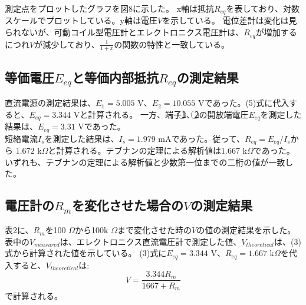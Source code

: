 \documentclass[a4paper,10pt]{jsarticle}
\begin{document}
測定点をプロットしたグラフを図8に示した。
x軸は抵抗$R_{eq}$を表しており、対数スケールでプロットしている。y軸は電圧$V$を示している。
電位差計は変化は見られないが、可動コイル型電圧計とエレクトロニクス電圧計は、$R_{eq}$が増加するにつれ$V$が減少しており、$\frac{1}{1 + x}$の関数の特性と一致している。


\subsection{等価電圧$E_{eq}$と等価内部抵抗$R_{eq}$の測定結果}
直流電源の測定結果は、$E_1 = 5.005$ V、$E_2 = 10.055$ Vであった。(5)式に代入すると、$E_{eq} = 3.344$ Vと計算される。
一方、端子\textcircled{1}、\textcircled{2}の開放端電圧$E_{eq}$を測定した結果は、$E_{eq} = 3.31$ Vであった。\\
短絡電流$I_s$を測定した結果は、$I_s = 1.979$ mAであった。従って、$R_{eq} = E_{eq}/I_s$から $1.672$ k$\Omega$と計算される。テブナンの定理による解析値は$1.667$ k$\Omega$であった。
\\いずれも、テブナンの定理による解析値と少数第一位までの二桁の値が一致した。
\subsection{電圧計の$R_m$を変化させた場合の$V$の測定結果}
表2に、$R_m$を100 $\Omega$から100k $\Omega$まで変化させた時の$V$の値の測定結果を示した。
表中の$V_{measured}$は、エレクトロニクス直流電圧計で測定した値、$V_{theoretical}$は、(3)式から計算された値を示している。
(3)式に$E_{eq} = 3.344$ V、$R_{eq} = 1.667$ k$\Omega$を代入すると、$V_{theoretical}$は:
\begin{equation}
  V = \frac{3.344R_m}{1667 + R_m}
\end{equation}
で計算される。
\clearpage 
\begin{table}[htbp]
  \centering
  \caption{Measured and theoretical values of V corresponding to $R_m$}
  \label{tab:addlabel}%
\end{table}%
\end{document}

